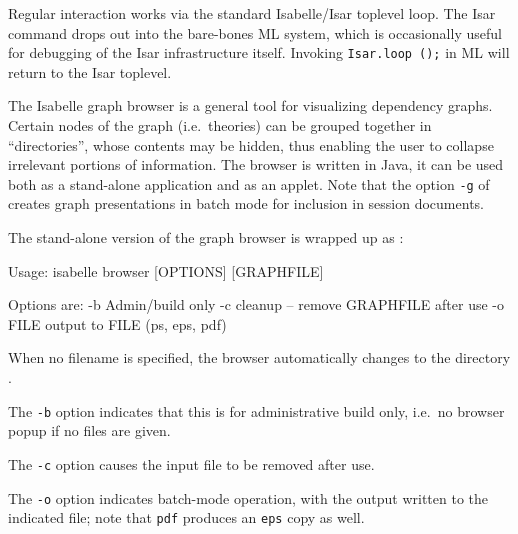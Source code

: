 \begin{isabellebody}
\begin{isamarkuptext}
  Regular interaction works via the standard Isabelle/Isar toplevel
  loop.  The Isar command \hyperlink{command.exit}{\mbox{}} drops out into the
  bare-bones ML system, which is occasionally useful for debugging of
  the Isar infrastructure itself.  Invoking \verb|Isar.loop|~\verb|();| in ML will return to the Isar toplevel.%
\end{isamarkuptext}%
\isamarkuptrue%
%
\isamarkuptrue%
%
\begin{isamarkuptext}%
The Isabelle graph browser is a general tool for visualizing
  dependency graphs.  Certain nodes of the graph (i.e.\ theories) can
  be grouped together in ``directories'', whose contents may be
  hidden, thus enabling the user to collapse irrelevant portions of
  information.  The browser is written in Java, it can be used both as
  a stand-alone application and as an applet.  Note that the option
  \verb|-g| of \hyperlink{tool.usedir}{\mbox{}} creates graph presentations
  in batch mode for inclusion in session documents.%
\end{isamarkuptext}%
\isamarkuptrue%
%
\isamarkuptrue%
%
\begin{isamarkuptext}%
The stand-alone version of the graph browser is wrapped up as
  \hypertarget{tool.browser}{\hyperlink{tool.browser}{\mbox{}}}:
\begin{ttbox}
Usage: isabelle browser [OPTIONS] [GRAPHFILE]

  Options are:
    -b           Admin/build only
    -c           cleanup -- remove GRAPHFILE after use
    -o FILE      output to FILE (ps, eps, pdf)
\end{ttbox}
  When no filename is specified, the browser automatically changes to
  the directory \hyperlink{setting.ISABELLE-BROWSER-INFO}{\mbox{}}.

  \medskip The \verb|-b| option indicates that this is for
  administrative build only, i.e.\ no browser popup if no files are
  given.

  The \verb|-c| option causes the input file to be removed
  after use.

  The \verb|-o| option indicates batch-mode operation, with the
  output written to the indicated file; note that \verb|pdf|
  produces an \verb|eps| copy as well.


\end{isamarkuptext}
\end{isabellebody}
